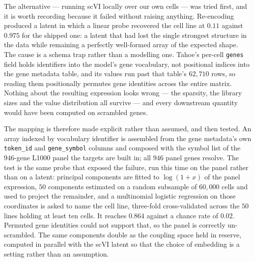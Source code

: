 The alternative --- running scVI locally over our own cells --- was tried first, and
it is worth recording because it failed without raising anything. Re-encoding
produced a latent in which a linear probe recovered the cell line at $0.11$
against $0.975$ for the shipped one: a latent that had lost the single strongest
structure in the data while remaining a perfectly well-formed array of the
expected shape. The cause is a schema trap rather than a modelling one. Tahoe's
per-cell \texttt{genes} field holds identifiers into the model's gene vocabulary,
not positional indices into the gene metadata table, and its values run past that
table's $62{,}710$ rows, so reading them positionally permutes gene identities
across the entire matrix. Nothing about the resulting expression looks wrong ---
the sparsity, the library sizes and the value distribution all survive --- and every
downstream quantity would have been computed on scrambled genes.

The mapping is therefore made explicit rather than assumed, and then tested. An
array indexed by vocabulary identifier is assembled from the gene metadata's own
\texttt{token\_id} and \texttt{gene\_symbol} columns and composed with the symbol
list of the $946$-gene L1000 panel the targets are built in; all $946$ panel genes
resolve. The test is the same probe that exposed the failure, run this time on the
panel rather than on a latent: principal components are fitted to $\log(1+x)$ of
the panel expression, $50$ components estimated on a random subsample of $60{,}000$
cells and used to project the remainder, and a multinomial logistic regression on
those coordinates is asked to name the cell line, three-fold cross-validated across
the $50$ lines holding at least ten cells. It reaches $0.864$ against a chance rate
of $0.02$. Permuted gene identities could not support that, so the panel is
correctly un-scrambled. The same components double as the coupling space held in
reserve, computed in parallel with the scVI latent so that the choice of embedding
is a setting rather than an assumption.

